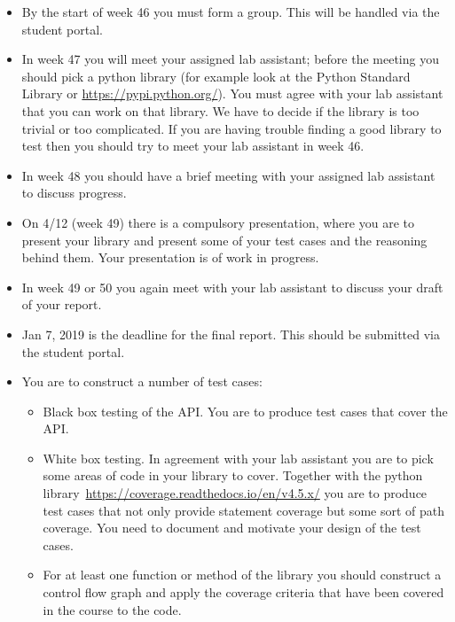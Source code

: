 \documentclass[a4page]{article}
\begin{document}
  \begin{itemize}
  \item By  the start of  week  46 you must form a group. This will be
    handled via the student portal.
  \item In week 47 you will meet your assigned lab assistant; before the
    meeting you should pick a python library (for example look at the Python
    Standard Library or \url{https://pypi.python.org/}). You must agree
    with your lab assistant that you can work on that library. We have
    to decide if the library is too trivial or too complicated. If you are
    having trouble finding a good library to test then you should try to meet
    your lab assistant in week 46.
  \item In week 48 you should have a brief meeting with your assigned lab
    assistant to discuss progress.
\item On 4/12 (week 49) there is a compulsory presentation, where you are
      to present your library and present some of your test cases
      and the reasoning behind them. Your presentation is of work in
      progress.
    \item In week 49 or 50 you again meet with your lab assistant to
      discuss your draft of your  report.
    \item Jan 7,  2019 is  the deadline for the final
      report. This should be submitted via the student portal.

\end{itemize}


\begin{itemize}

    \item You are to construct a number of test cases:
    \begin{itemize}
    \item  Black box testing of the API. You are to produce test cases
      that cover the API.
    \item  White box testing. In agreement with your lab assistant you
      are to pick some areas of code in your library to cover. Together with
      the python library~\url{https://coverage.readthedocs.io/en/v4.5.x/} you are
      to produce test cases that not only provide statement coverage
      but some sort of path coverage. You need to document and
      motivate your design of the test cases. 
    \item For at least one function or method of the library you
      should construct a control flow graph and apply the coverage criteria
      that have been covered in the course to the code.

    \end{itemize}
  \end{itemize}
\end{document}
